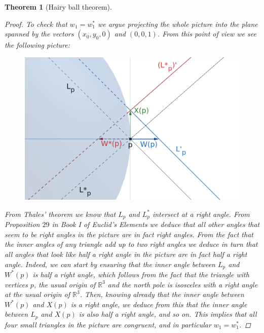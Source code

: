 \documentclass[A4paper, 12pt, british, reqno]{amsart}
\newcommand{\R}{\mathbb{R}} %
\theoremstyle{plain}
\newtheorem{thm}{Theorem}[section]
\theoremstyle{definition}
\theoremstyle{remark}
\theoremstyle{plain}
\theoremstyle{definition}
\theoremstyle{remark}
\theoremstyle{plain}
\theoremstyle{definition}
\theoremstyle{remark}
\begin{document}
\begin{thm}[Hairy ball theorem]
\begin{proof}
	To check that $w_{1}=w_{1}^{*}$ we argue projecting the whole picture into the plane spanned by the vectors $(x_{0},y_{0},0)$ and $(0,0,1)$.
	From this point of view we see the following picture:
	
	\begin{figure}[htp]
	    \centering
	    \includegraphics[scale=.4]{HairyBall1.png}
	\end{figure}

	From Thales' theorem we know that $L_{p}$ and $L^{*}_{p}$ intersect at a right angle.
	From Proposition $29$ in Book I of Euclid's \textit{Elements} we deduce that all other angles that seem to be right angles in the picture are in fact right angles.
	From the fact that the inner angles of any triangle add up to two right angles we deduce in turn that all angles that look like half a right angle in the picture are in fact half a right angle.
	Indeed, we can start by ensuring that the inner angle between $L_{p}$ and $W^{*}(p)$ is half a right angle, which follows from the fact that the triangle with vertices $p$, the usual origin of $\R^{3}$ and the north pole is isosceles with a right angle at the usual origin of $\R^{3}$.
	Then, knowing already that the inner angle between $W^{*}(p)$ and $X(p)$ is a right angle, we deduce from this that the inner angle between $L_{p}$ and $X(p)$ is also half a right angle, and so on.
	This implies that all four small triangles in the picture are congruent, and in particular $w_{1}=w_{1}^{*}$.


\end{proof}
\end{thm}
\end{document}
